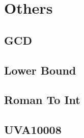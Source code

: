 \section{Others}
\subsection{GCD}

\subsection{Lower Bound}

\subsection{Roman To Int}

\subsection{UVA10008}
